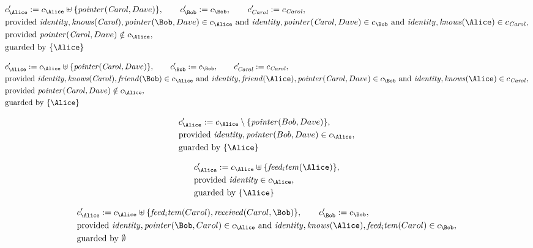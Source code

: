 \begin{align*}
&
c'_
{
\Alice
}
 := 
c_
{
\Alice
}
 \uplus 
\{
\mathit{
pointer
}
(
\mathit{Carol}
,
Dave
)
\}
, \qquad 
c'_
{
\Bob
}
 := 
c_
{
\Bob
}
, \qquad 
c'_
{
\mathit{Carol}
}
 := 
c_
{
\mathit{Carol}
}
,\\
&
\text{provided } 
\mathit{
identity
}
,
\mathit{
knows
}
(
\mathit{Carol}
)
,
\mathit{
pointer
}
(
\Bob
,
Dave
)
 \in c_
{
\Alice
}
 \text{ and } 
\mathit{
identity
}
,
\mathit{
pointer
}
(
\mathit{Carol}
,
Dave
)
 \in c_
{
\Bob
}
 \text{ and } 
\mathit{
identity
}
,
\mathit{
knows
}
(
\Alice
)
 \in c_
{
\mathit{Carol}
}
,\\
&
\text{provided } 
\mathit{
pointer
}
(
\mathit{Carol}
,
Dave
)
 \notin c_
{
\Alice
}
,\\
&
\text{guarded by } \{
\Alice
\}
\end{align*}

\begin{align*}
&
c'_
{
\Alice
}
 := 
c_
{
\Alice
}
 \uplus 
\{
\mathit{
pointer
}
(
\mathit{Carol}
,
Dave
)
\}
, \qquad 
c'_
{
\Bob
}
 := 
c_
{
\Bob
}
, \qquad 
c'_
{
\mathit{Carol}
}
 := 
c_
{
\mathit{Carol}
}
,\\
&
\text{provided } 
\mathit{
identity
}
,
\mathit{
knows
}
(
\mathit{Carol}
)
,
\mathit{
friend
}
(
\Bob
)
 \in c_
{
\Alice
}
 \text{ and } 
\mathit{
identity
}
,
\mathit{
friend
}
(
\Alice
)
,
\mathit{
pointer
}
(
\mathit{Carol}
,
Dave
)
 \in c_
{
\Bob
}
 \text{ and } 
\mathit{
identity
}
,
\mathit{
knows
}
(
\Alice
)
 \in c_
{
\mathit{Carol}
}
,\\
&
\text{provided } 
\mathit{
pointer
}
(
\mathit{Carol}
,
Dave
)
 \notin c_
{
\Alice
}
,\\
&
\text{guarded by } \{
\Alice
\}
\end{align*}

\begin{align*}
&
c'_
{
\Alice
}
 := 
c_
{
\Alice
}
 \setminus 
\{
\mathit{
pointer
}
(
Bob
,
Dave
)
\}
,\\
&
\text{provided } 
\mathit{
identity
}
,
\mathit{
pointer
}
(
Bob
,
Dave
)
 \in c_
{
\Alice
}
,\\
&
\text{guarded by } \{
\Alice
\}
\end{align*}

\begin{align*}
&
c'_
{
\Alice
}
 := 
c_
{
\Alice
}
 \uplus 
\{
\mathit{
feed_item
}
(
\Alice
)
\}
,\\
&
\text{provided } 
\mathit{
identity
}
 \in c_
{
\Alice
}
,\\
&
\text{guarded by } \{
\Alice
\}
\end{align*}

\begin{align*}
&
c'_
{
\Alice
}
 := 
c_
{
\Alice
}
 \uplus 
\{
\mathit{
feed_item
}
(
Carol
)
,
\mathit{
received
}
(
Carol
,
\Bob
)
\}
, \qquad 
c'_
{
\Bob
}
 := 
c_
{
\Bob
}
,\\
&
\text{provided } 
\mathit{
identity
}
,
\mathit{
pointer
}
(
\Bob
,
Carol
)
 \in c_
{
\Alice
}
 \text{ and } 
\mathit{
identity
}
,
\mathit{
knows
}
(
\Alice
)
,
\mathit{
feed_item
}
(
Carol
)
 \in c_
{
\Bob
}
,\\
&
\text{guarded by } \emptyset
\end{align*}

